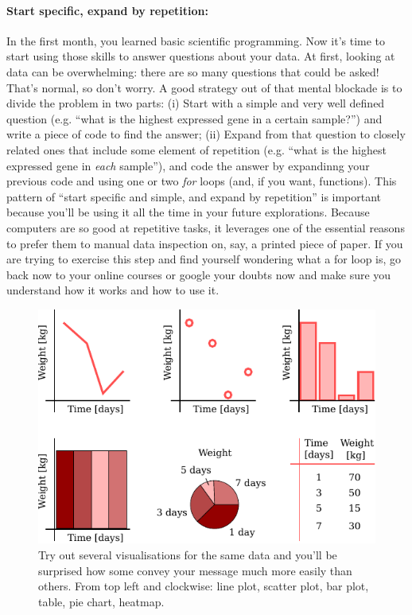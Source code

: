 \documentclass[12pt,a4paper,notitlepage,onecolumn]{article}
\begin{document}
\paragraph{Start specific, expand by repetition:} In the first month, you learned basic scientific programming. Now it's time to start using those skills to answer questions about your data. At first, looking at data can be overwhelming: there are so many questions that could be asked! That's normal, so don't worry. A good strategy out of that mental blockade is to divide the problem in two parts: (i) Start with a simple and very well defined question (e.g. ``what is the highest expressed gene in a certain sample?'') and write a piece of code to find the answer; (ii) Expand from that question to closely related ones that include some element of repetition (e.g. ``what is the highest expressed gene in \textit{each} sample''), and code the answer by expandinng your previous code and using one or two \textit{for} loops (and, if you want, functions). This pattern of ``start specific and simple, and expand by repetition'' is important because you'll be using it all the time in your future explorations. Because computers are so good at repetitive tasks, it leverages one of the essential reasons to prefer them to manual data inspection on, say, a printed piece of paper. If you are trying to exercise this step and find yourself wondering what a for loop is, go back now to your online courses or google your doubts now and make sure you understand how it works and how to use it.


\begin{figure}
\begin{center}
\includegraphics[width=0.7\linewidth]{Visualisations}
\caption{Try out several visualisations for the same data and you'll be surprised how some convey your message much more easily than others. From top left and clockwise: line plot, scatter plot, bar plot, table, pie chart, heatmap.}
\label{fig:viz}
\end{center}
\end{figure}
\end{document}
